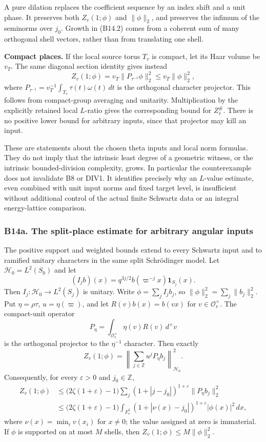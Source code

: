 A pure dilation replaces the coefficient sequence by an index shift and a unit phase. It preserves both \(Z_v(1;\phi)\) and \(\|\phi\|_2\), and preserves the infimum of the seminorms over \(j_0\). Growth in (B14.2) comes from a coherent sum of many orthogonal shell vectors, rather than from translating one shell.

\textbf{Compact places.} If the local source torus \(T_v\) is compact, let its Haar volume be \(v_T\). The same diagonal section identity gives instead \[
 Z_v(1;\phi)=v_T\|P_{\tau^{-1}}\phi\|_2^2
 \le v_T\|\phi\|_2^2,
\tag{B14.4}
\] where \(P_{\tau^{-1}}=v_T^{-1}\int_{T_v}\tau(t)\omega(t)\,dt\) is the orthogonal character projector. This follows from compact-group averaging and unitarity. Multiplication by the explicitly retained local \(L\)-ratio gives the corresponding bound for \(Z_v^\#\). There is no positive lower bound for arbitrary inputs, since that projector may kill an input.

These are statements about the chosen theta inputs and local norm formulas. They do not imply that the intrinsic least degree of a geometric witness, or the intrinsic bounded-division complexity, grows. In particular the counterexample does not invalidate B8 or DIV1. It identifies precisely why an \(L\)-value estimate, even combined with unit input norms and fixed target level, is insufficient without additional control of the actual finite Schwartz data or an integral energy-lattice comparison.

\subsubsection{B14a. The split-place estimate for arbitrary angular inputs}\label{b14a.-the-split-place-estimate-for-arbitrary-angular-inputs}

The positive support and weighted bounds extend to every Schwartz input and to ramified unitary characters in the same split Schrödinger model. Let \(\mathcal H_0=L^2(S_0)\) and let \[
 (I_j b)(x)=q^{3j/2}b(\varpi^{-j}x)\mathbf1_{S_j}(x).
\] Then \(I_j:\mathcal H_0\to L^2(S_j)\) is unitary. Write \(\phi=\sum_j I_jb_j\), so \(\|\phi\|_2^2=\sum_j\|b_j\|_2^2\). Put \(\eta=\rho\tau\), \(u=\eta(\varpi)\), and let \(R(v)b(x)=b(vx)\) for \(v\in\mathcal O_v^\times\). The compact-unit operator \[
 P_\eta=\int_{\mathcal O_v^\times}\eta(v)R(v)\,d^\times v
\] is the orthogonal projector to the \(\eta^{-1}\) character. Then exactly \[
 Z_v(1;\phi)=
 \left\|\sum_{j\in\mathbb Z}u^jP_\eta b_j\right\|_{\mathcal H_0}^2.
\tag{B14a.1}
\] Consequently, for every \(\varepsilon>0\) and \(j_0\in\mathbb Z\), \[
 \begin{aligned}
 Z_v(1;\phi)
 &\le \bigl(2\zeta(1+\varepsilon)-1\bigr)
 \sum_j(1+|j-j_0|)^{1+\varepsilon}\|P_\eta b_j\|_2^2\\
 &\le \bigl(2\zeta(1+\varepsilon)-1\bigr)
 \int_{F_v^3}(1+|\nu(x)-j_0|)^{1+\varepsilon}|\phi(x)|^2\,dx,
 \end{aligned}
\tag{B14a.2}
\] where \(\nu(x)=\min_i v(x_i)\) for \(x\ne0\); the value assigned at zero is immaterial. If \(\phi\) is supported on at most \(M\) shells, then \(Z_v(1;\phi)\le M\|\phi\|_2^2\).

